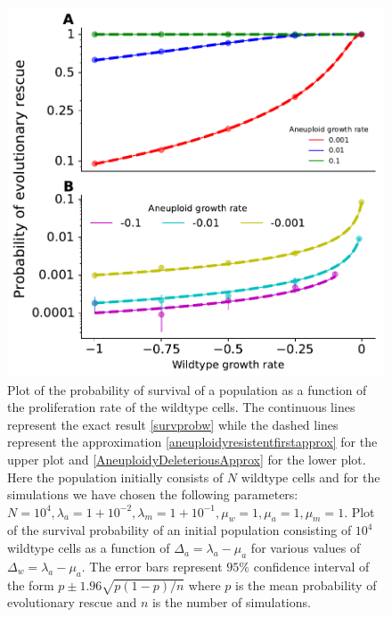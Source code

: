 \documentclass[12pt]{extarticle}
\begin{document}
\begin{figure}[!t]
 \vspace*{1\baselineskip}
\includegraphics[width=1\textwidth]{Figures/CombinedSubplot.pdf}
\caption{Plot of the probability of survival of a population as a function of the proliferation rate of the wildtype cells. The continuous lines represent the exact result \eqref{survprobw} while the dashed lines represent the approximation \eqref{aneuploidyresistentfirstapprox} for the upper plot and \eqref{AneuploidyDeleteriousApprox} for the lower plot.  Here the population initially consists of $N$ wildtype cells and for the simulations we have chosen the following parameters: $N=10^4, \lambda_a=1+10^{-2},\lambda_m=1+10^{-1},\mu_w=1,\mu_a=1,\mu_m=1$. Plot of the survival probability of an initial population consisting of $10^{4}$ wildtype cells as a function of $\Delta_a=\lambda_a-\mu_a$ for various values of $\Delta_w=\lambda_a-\mu_a$. The error bars represent $95\%$ confidence interval of the form $p\pm1.96\sqrt{p\left(1-p\right)/n}$ where $p$ is the mean probability of evolutionary rescue and $n$ is the number of simulations.}
\label{SurvPlot}
\end{figure}
\end{document}
